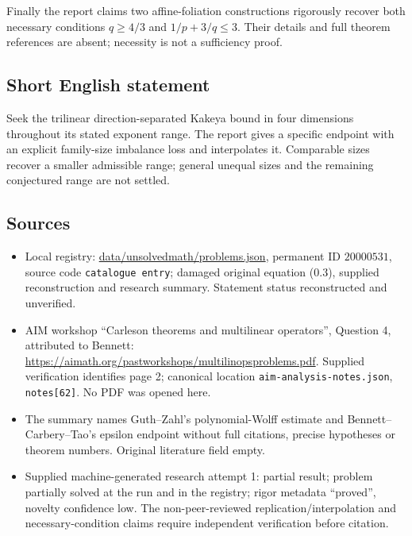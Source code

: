 \documentclass[11pt]{article}
\begin{document}
Finally the report claims two affine-foliation constructions rigorously recover both necessary conditions $q\geq4/3$ and $1/p+3/q\leq3$. Their details and full theorem references are absent; necessity is not a sufficiency proof.
\subsection{Short English statement}
Seek the trilinear direction-separated Kakeya bound in four dimensions throughout its stated exponent range. The report gives a specific endpoint with an explicit family-size imbalance loss and interpolates it. Comparable sizes recover a smaller admissible range; general unequal sizes and the remaining conjectured range are not settled.
\subsection{Sources}
\begin{itemize}
\item Local registry: \url{data/unsolvedmath/problems.json}, permanent ID $20000531$, source code \texttt{catalogue entry}; damaged original equation (0.3), supplied reconstruction and research summary. Statement status reconstructed and unverified.
\item AIM workshop ``Carleson theorems and multilinear operators'', Question 4, attributed to Bennett: \url{https://aimath.org/pastworkshops/multilinopsproblems.pdf}. Supplied verification identifies page 2; canonical location \texttt{aim-analysis-notes.json}, \texttt{notes[62]}. No PDF was opened here.
\item The summary names Guth--Zahl's polynomial-Wolff estimate and Bennett--Carbery--Tao's epsilon endpoint without full citations, precise hypotheses or theorem numbers. Original literature field empty.
\item Supplied machine-generated research attempt 1: partial result; problem partially solved at the run and in the registry; rigor metadata ``proved'', novelty confidence low. The non-peer-reviewed replication/interpolation and necessary-condition claims require independent verification before citation.
\end{itemize}
\end{document}
